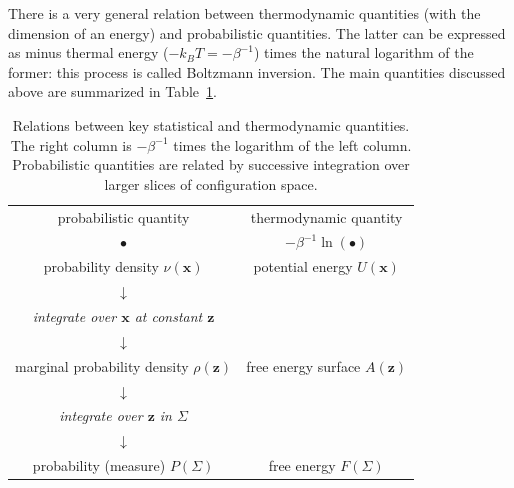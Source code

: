 \documentclass[9pt,review]{livecoms}
\newcommand{\vx}{\mathbf{x}}
\newcommand{\vz}{\mathbf{z}}
\providecommand{\DIFaddtex}[1]{{\protect\color{blue}\uwave{#1}}} %
\providecommand{\DIFdeltex}[1]{{\protect\color{red}\sout{#1}}}                      %
\providecommand{\DIFaddbegin}{} %
\providecommand{\DIFaddend}{} %
\providecommand{\DIFdelbegin}{} %
\providecommand{\DIFdelend}{} %
\providecommand{\DIFadd}[1]{\texorpdfstring{\DIFaddtex{#1}}{#1}} %
\providecommand{\DIFdel}[1]{\texorpdfstring{\DIFdeltex{#1}}{}} %
\newcommand{\DIFscaledelfig}{0.5}
\newlength{\DIFdelgraphicswidth} %
\newlength{\DIFdelgraphicsheight} %
\newcommand{\DIFaddincludegraphics}[2][]{{\color{blue}\fbox{\DIFOincludegraphics[#1]{#2}}}} %
\newcommand{\DIFdelincludegraphics}[2][]{%
\sbox{\DIFdelgraphicsbox}{\DIFOincludegraphics[#1]{#2}}%
\settoboxwidth{\DIFdelgraphicswidth}{\DIFdelgraphicsbox} %
\settoboxtotalheight{\DIFdelgraphicsheight}{\DIFdelgraphicsbox} %
\scalebox{\DIFscaledelfig}{%
\parbox[b]{\DIFdelgraphicswidth}{\usebox{\DIFdelgraphicsbox}\\[-\baselineskip] \rule{\DIFdelgraphicswidth}{0em}}\llap{\resizebox{\DIFdelgraphicswidth}{\DIFdelgraphicsheight}{%
\setlength{\unitlength}{\DIFdelgraphicswidth}%
\begin{picture}(1,1)%
\thicklines\linethickness{2pt} %
{\color[rgb]{1,0,0}\put(0,0){\framebox(1,1){}}}%
{\color[rgb]{1,0,0}\put(0,0){\line( 1,1){1}}}%
{\color[rgb]{1,0,0}\put(0,1){\line(1,-1){1}}}%
\end{picture}%
}\hspace*{3pt}}} %
} %
\DeclareRobustCommand{\DIFaddbegin}{\DIFOaddbegin \let\includegraphics\DIFaddincludegraphics} %
\DeclareRobustCommand{\DIFaddend}{\DIFOaddend \let\includegraphics\DIFOincludegraphics} %
\DeclareRobustCommand{\DIFdelbegin}{\DIFOdelbegin \let\includegraphics\DIFdelincludegraphics} %
\DeclareRobustCommand{\DIFdelend}{\DIFOaddend \let\includegraphics\DIFOincludegraphics} %
\begin{document}
There is a very general relation between thermodynamic quantities (with the dimension of an energy) and probabilistic quantities.
The latter can be expressed as minus thermal energy (\DIFdelbegin \DIFdel{$-k_B T = -\beta^{-1}$}\DIFdelend \DIFaddbegin \DIFadd{$-k_\mathrm{B} T = -\beta^{-1}$}\DIFaddend ) times the natural logarithm of the former: this process is called Boltzmann inversion.
The main quantities discussed above are summarized in Table~\ref{tab:quantities}.


\begin{table}[]
\small
    \centering
\begin{tabular}{c|c}
probabilistic quantity & thermodynamic quantity  \\
$\bullet$ &   $-\beta^{-1} \ln(\bullet)$ \\
\hline
probability density $\nu(\vx)$  & potential energy  $U(\vx)$\\
$\downarrow$ &  \\
\textit{integrate over $\vx$ at constant $\vz$} & \\
$\downarrow$ &  \\
marginal probability density $\rho(\vz)$ & free energy surface $A(\vz)$ \\
$\downarrow$ &  \\
\textit{integrate over $\vz$ in $\Sigma$} & \\
$\downarrow$ &  \\
probability (measure) $P(\Sigma)$  & free energy  $F(\Sigma)$\\
\end{tabular}
    \caption{Relations between key statistical and thermodynamic quantities.
    The right column is $-\beta^{-1}$ times the logarithm of the left column.
    Probabilistic quantities are related by successive integration over larger slices of configuration space.}
    \label{tab:quantities}
\end{table}
\end{document}
